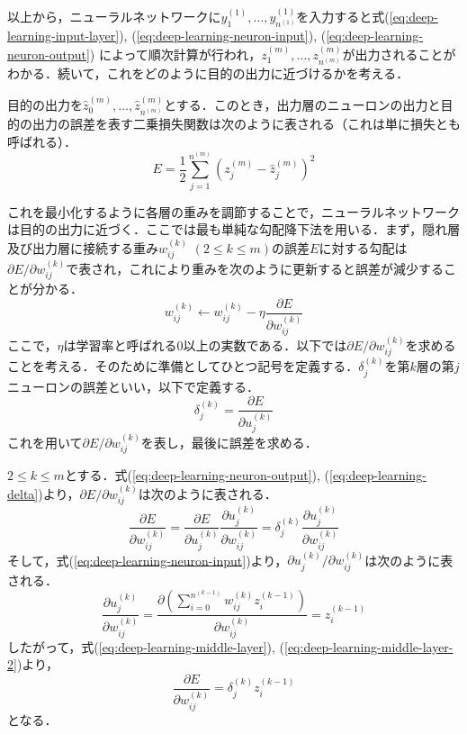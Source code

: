 以上から，ニューラルネットワークに$y_1^{(1)}, \dots, y_{n^{(1)}}^{(1)}$を入力すると式(\ref{eq:deep-learning-input-layer}), (\ref{eq:deep-learning-neuron-input}), (\ref{eq:deep-learning-neuron-output})
によって順次計算が行われ，$z_1^{(m)}, \dots, z_{n^{(m)}}^{(m)}$が出力されることがわかる．続いて，これをどのように目的の出力に近づけるかを考える．

目的の出力を$\hat{z}_0^{(m)}, \dots, \hat{z}_{n^{(m)}}^{(m)}$とする．このとき，出力層のニューロンの出力と目的の出力の誤差を表す二乗損失関数は次のように表される（これは単に損失とも呼ばれる）．
\begin{equation}
  E = \frac{1}{2} \sum_{j=1}^{n^{(m)}} \left( z_j^{(m)} - \hat{z}_j^{(m)} \right)^2
  \label{eq:deep-learning-loss}
\end{equation}

これを最小化するように各層の重みを調節することで，ニューラルネットワークは目的の出力に近づく．ここでは最も単純な勾配降下法を用いる．まず，隠れ層及び出力層に接続する重み$w_{ij}^{(k)}$ $(2 \leq k \leq m)$の誤差$E$に対する勾配は$\partial E / \partial w_{ij}^{(k)}$で表され，これにより重みを次のように更新すると誤差が減少することが分かる．
\begin{equation}
  w_{ij}^{(k)} \leftarrow w_{ij}^{(k)} - \eta \frac{\partial E}{\partial w_{ij}^{(k)}}
  \label{eq:deep-learning-gradient-descent}
\end{equation}
ここで，$\eta$は学習率と呼ばれる$0$以上の実数である．以下では$\partial E / \partial w_{ij}^{(k)}$を求めることを考える．そのために準備としてひとつ記号を定義する．$\delta_j^{(k)}$を第$k$層の第$j$ニューロンの誤差といい，以下で定義する．
\begin{equation}
  \delta_j^{(k)} = \frac{\partial E}{\partial u_j^{(k)}}
  \label{eq:deep-learning-delta}
\end{equation}
これを用いて$\partial E / \partial w_{ij}^{(k)}$を表し，最後に誤差を求める．

$2 \leq k \leq m$とする．式(\ref{eq:deep-learning-neuron-output}), (\ref{eq:deep-learning-delta})より，$\partial E / \partial w_{ij}^{(k)}$は次のように表される．
\begin{equation}
  \frac{\partial E}{\partial w_{ij}^{(k)}} =
  \frac{\partial E}{\partial u_j^{(k)}} \frac{\partial u_j^{(k)}} {\partial w_{ij}^{(k)}} =
  \delta_j^{(k)} \frac{\partial u_j^{(k)}} {\partial w_{ij}^{(k)}}
  \label{eq:deep-learning-middle-layer}
\end{equation}
そして，式(\ref{eq:deep-learning-neuron-input})より，$\partial u_j^{(k)} / \partial w_{ij}^{(k)}$は次のように表される．
\begin{equation}
  \frac{\partial u_j^{(k)}} {\partial w_{ij}^{(k)}} =
  \frac{ \partial \left( \sum_{i=0}^{n^{(k-1)}} w_{ij}^{(k)} z_i^{(k-1)} \right)} {\partial w_{ij}^{(k)}} =
  z_i^{(k-1)}
  \label{eq:deep-learning-middle-layer-2}
\end{equation}
したがって，式(\ref{eq:deep-learning-middle-layer}), (\ref{eq:deep-learning-middle-layer-2})より，
\begin{equation}
  \frac{\partial E}{\partial w_{ij}^{(k)}} =
  \delta_j^{(k)} z_i^{(k-1)}
  \label{eq:deep-learning-middle-layer-3}
\end{equation}
となる．


